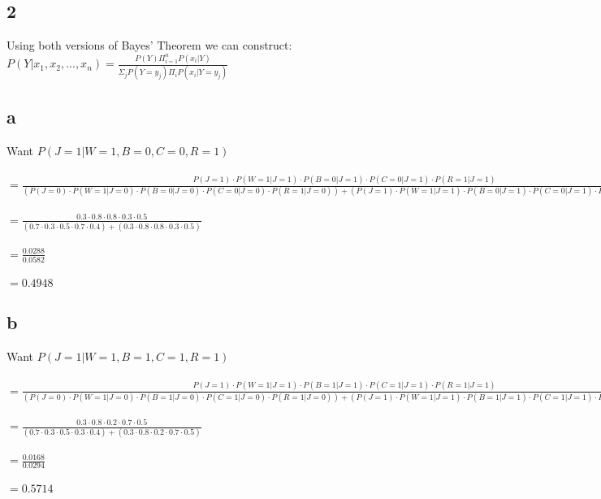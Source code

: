 \documentclass[letterpaper,notitlepage,twoside, fleqn]{article}
\begin{document}
  \subsection*{2}
  Using both versions of Bayes' Theorem we can construct: \\
  $P(Y|x_1, x_2, ..., x_n) = \frac{P(Y) \Pi_{i=1}^n P(x_i|Y)}{\Sigma_j P(Y=y_j) \Pi_i P(x_i|Y=y_j)}$ 
    \subsection*{a}
    Want $P(J = 1 | W = 1, B = 0, C = 0, R = 1)$ \\\\
    $= \frac{P(J=1) \cdot P(W=1|J=1) \cdot P(B=0|J=1) \cdot P(C=0|J=1) \cdot P(R=1|J=1)}{(P(J=0) \cdot P(W=1|J=0) \cdot P(B=0|J=0) \cdot P(C=0|J=0) \cdot P(R=1|J=0)) + (P(J=1) \cdot P(W=1|J=1) \cdot P(B=0|J=1) \cdot P(C=0|J=1) \cdot P(R=1|J=1))}$ \\\\
    $= \frac{0.3 \cdot 0.8 \cdot 0.8 \cdot 0.3 \cdot 0.5}{(0.7 \cdot 0.3 \cdot 0.5 \cdot 0.7 \cdot 0.4)+(0.3 \cdot 0.8 \cdot 0.8 \cdot 0.3 \cdot 0.5)}$ \\\\
    $ = \frac{0.0288}{0.0582}$ \\\\
    $ = 0.4948$ \\
    \subsection*{b}
    Want $P(J = 1 | W = 1, B = 1, C = 1, R = 1)$ \\\\
    $= \frac{P(J=1) \cdot P(W=1|J=1) \cdot P(B=1|J=1) \cdot P(C=1|J=1) \cdot P(R=1|J=1)}{(P(J=0) \cdot P(W=1|J=0) \cdot P(B=1|J=0) \cdot P(C=1|J=0) \cdot P(R=1|J=0)) + (P(J=1) \cdot P(W=1|J=1) \cdot P(B=1|J=1) \cdot P(C=1|J=1) \cdot P(R=1|J=1))}$ \\\\
    $=\frac{0.3 \cdot 0.8 \cdot 0.2 \cdot 0.7 \cdot 0.5}{(0.7 \cdot 0.3 \cdot 0.5 \cdot 0.3 \cdot 0.4)+(0.3 \cdot 0.8 \cdot 0.2 \cdot 0.7 \cdot 0.5)}$ \\\\
    $=\frac{0.0168}{0.0294}$ \\\\
    $= 0.5714$\\\\
        
\end{document}
